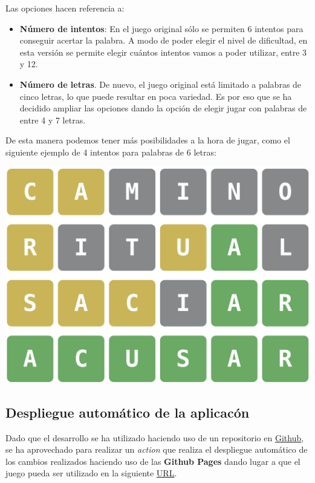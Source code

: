 \documentclass{\ClassPath/viu-tfm-template}
\begin{document}
Las opciones hacen referencia a:
\vspace{-1em}
\begin{itemize}
    \item \textbf{Número de intentos}: En el juego original sólo se permiten 6 intentos para conseguir acertar la palabra. A modo de poder elegir el nivel de dificultad, en esta versión se permite elegir cuántos intentos vamos a poder utilizar, entre 3 y 12.
    \item \textbf{Número de letras}. De nuevo, el juego original está limitado a palabras de cinco letras, lo que puede resultar en poca variedad. Es por eso que se ha decidido ampliar las opciones dando la opción de elegir jugar con palabras de entre 4 y 7 letras.
\end{itemize}
\vspace{-1em}

De esta manera podemos tener más posibilidades a la hora de jugar, como el siguiente ejemplo de 4 intentos para palabras de 6 letras:

\vspace{-1em}
\begin{center}
    \includegraphics[width=0.4\linewidth]{img/6letras.png}
\end{center}
\vspace{-1em}


\subsection{Despliegue automático de la aplicacón}
Dado que el desarrollo se ha utilizado haciendo uso de un repositorio en \href{https://github.com/yuki/jawc}{Github}, se ha aprovechado para realizar un \textit{action} que realiza el despliegue automático de los cambios realizados haciendo uso de las \textbf{Github Pages} dando lugar a que el juego pueda ser utilizado en la siguiente \href{https://yuki.github.io/jawc/}{URL}.
\end{document}
